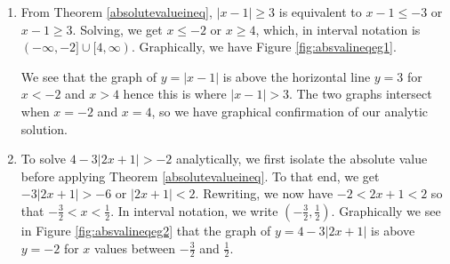 {
\begin{enumerate}

\item  From Theorem \ref{absolutevalueineq}, $|x-1|\geq3$ is equivalent to $x-1 \leq -3$ or $x-1 \geq 3$. Solving, we get $x \leq -2$ or $x \geq 4$, which, in interval notation is  $(-\infty,-2] \cup [4,\infty)$.  Graphically, we have Figure \ref{fig:absvalineqeg1}.



We see that the graph of $y=|x-1|$  is above the horizontal line $y=3$ for $x < -2$ and $x > 4$ hence this is where $|x-1| > 3$.  The two graphs intersect when $x=-2$ and $x=4$, so we have graphical confirmation of our analytic solution.

\item  To solve $4 - 3|2x+1| > -2$ analytically, we first isolate the absolute value before applying Theorem \ref{absolutevalueineq}.  To that end, we get $-3|2x+1|>-6$ or $|2x+1|<2$.  Rewriting, we now have $-2 < 2x+1 < 2$ so that $-\frac{3}{2} < x < \frac{1}{2}$.  In interval notation, we write $\left(-\frac{3}{2}, \frac{1}{2}\right)$. Graphically we see in Figure \ref{fig:absvalineqeg2} that the graph of $y=4-3|2x+1|$ is above $y=-2$ for $x$ values between $-\frac{3}{2}$ and $\frac{1}{2}$.



\end{enumerate}}
